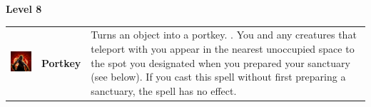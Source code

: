\textbf{Level 8} 
\begin{tabular}{ m{4cm}m{3cm}m{6cm} } 
	\includegraphics[width=4cm]{../Pictures/Gameplay/Spells/Icon/spell_icon.png} & \textbf{Portkey} & Turns an object into a portkey. . You and any creatures that teleport with you appear in the nearest unoccupied space to the spot you designated when you prepared your sanctuary (see below). If you cast this spell without first preparing a sanctuary, the spell has no effect. \\ 
\end{tabular}














